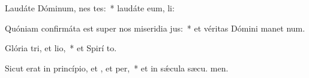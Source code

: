 \item Laudáte Dóminum, nes tes:~* laudáte eum,  li:
\item Quóniam confirmáta est super nos miseridia jus:~* et véritas Dómini manet  num.
\item Glória tri, et lio,~* et Spirí to.
\item Sicut erat in princípio, et , et per,~* et in sǽcula sæcu. men.

